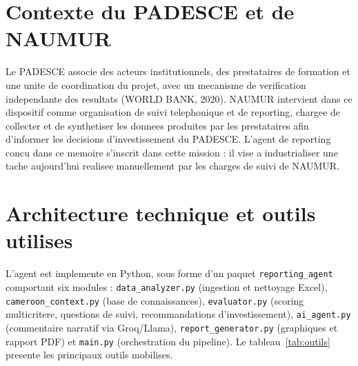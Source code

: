 \documentclass[12pt,a4paper,twoside,openany]{report}
\begin{document}
\section{Contexte du PADESCE et de NAUMUR}

Le PADESCE associe des acteurs institutionnels, des prestataires de formation et une unite de coordination du projet, avec un mecanisme de verification independante des resultats (WORLD BANK, 2020). NAUMUR intervient dans ce dispositif comme organisation de suivi telephonique et de reporting, chargee de collecter et de synthetiser les donnees produites par les prestataires afin d'informer les decisions d'investissement du PADESCE. L'agent de reporting concu dans ce memoire s'inscrit dans cette mission : il vise a industrialiser une tache aujourd'hui realisee manuellement par les charges de suivi de NAUMUR.

\section{Architecture technique et outils utilises}
\label{sec:outils}

L'agent est implemente en Python, sous forme d'un paquet \texttt{reporting\_agent} comportant six modules : \texttt{data\_analyzer.py} (ingestion et nettoyage Excel), \texttt{cameroon\_context.py} (base de connaissances), \texttt{evaluator.py} (scoring multicritere, questions de suivi, recommandations d'investissement), \texttt{ai\_agent.py} (commentaire narratif via Groq/Llama), \texttt{report\_generator.py} (graphiques et rapport PDF) et \texttt{main.py} (orchestration du pipeline). Le tableau~\ref{tab:outils} presente les principaux outils mobilises.
\end{document}
